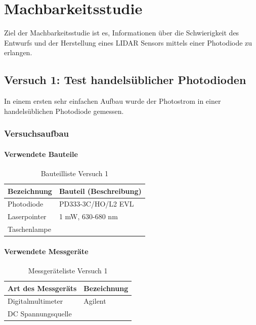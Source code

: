 \chapter{Machbarkeitsstudie}\label{chap:machbarkeitsstudie}
Ziel der Machbarkeitsstudie ist es, Informationen über die Schwierigkeit des Entwurfs und der Herstellung eines \ac{LIDAR} Sensors mittels einer Photodiode zu erlangen. 

\section{Versuch 1: Test handelsüblicher Photodioden}
In einem ersten sehr einfachen Aufbau wurde der Photostrom in einer handelsüblichen Photodiode gemessen.
\subsection{Versuchsaufbau}
\subsubsection{Verwendete Bauteile}

\begin{table}[H]
	\centering
	\caption{Bauteilliste Versuch 1}
	\begin{tabular}{|l|l|}
		\hline
		\textbf{Bezeichnung} & \textbf{Bauteil (Beschreibung)}
		\\\hline
		Photodiode & PD333-3C/HO/L2 EVL
		\\\hline
		Laserpointer & 1 mW, 630-680 nm
		\\\hline
		Taschenlampe & 
		\\\hline
	\end{tabular}
\end{table}

\subsubsection{Verwendete Messgeräte}
\begin{table}[H]
	\centering
	\caption{Messgeräteliste Versuch 1}
	\begin{tabular}{|l|l|}
		\hline
		\textbf{Art des Messgeräts} & \textbf{Bezeichnung}
		\\\hline
		Digitalmultimeter & Agilent
		\\\hline
		DC Spannungsquelle &
		\\\hline
	\end{tabular}
\end{table}
